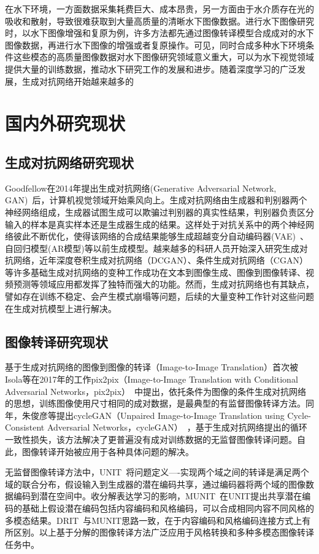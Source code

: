在水下环境，一方面数据采集耗费巨大、成本昂贵，另一方面由于水介质存在光的吸收和散射，导致很难获取到大量高质量的清晰水下图像数据。进行水下图像研究时，以水下图像增强和复原为例，许多方法都先通过图像转译模型合成成对的水下图像数据，再进行水下图像的增强或者复原操作。可见，同时合成多种水下环境条件这些模态的高质量图像数据对水下图像研究领域意义重大，可以为水下视觉领域提供大量的训练数据，推动水下研究工作的发展和进步。随着深度学习的广泛发展，生成对抗网络开始越来越多的


\section{国内外研究现状}
\subsection{生成对抗网络研究现状}
Goodfellow在2014年提出生成对抗网络(Generative Adversarial Network, GAN)~\cite{goodfellow2014generative}后，计算机视觉领域开始乘风向上。生成对抗网络由生成器和判别器两个神经网络组成，生成器试图生成可以欺骗过判别器的真实性结果，判别器负责区分输入的样本是真实样本还是生成器生成的结果。这样处于对抗关系中的两个神经网络彼此不断优化，使得该网络的合成结果能够生成超越变分自动编码器(VAE)~\cite{kingma2013auto}、自回归模型(AR模型)等以前生成模型。越来越多的科研人员开始深入研究生成对抗网络，近年深度卷积生成对抗网络（DCGAN）、条件生成对抗网络（CGAN）等许多基础生成对抗网络的变种工作成功在文本到图像生成、图像到图像转译、视频预测等领域应用都发挥了独特而强大的功能。然而，生成对抗网络也有其缺点，譬如存在训练不稳定、会产生模式崩塌等问题，后续的大量变种工作针对这些问题在生成对抗模型上进行解决。


\subsection{图像转译研究现状}
基于生成对抗网络的图像到图像的转译（Image-to-Image Translation）首次被Isola等在2017年的工作pix2pix（Image-to-Image Translation with Conditional Adversarial Networks，pix2pix）~\cite{isola2017image}中提出，依托条件为图像的条件生成对抗网络的思想，训练图像使用尺寸相同的成对数据，是最典型的有监督图像转译方法。同年，朱俊彦等提出cycleGAN（Unpaired Image-to-Image Translation using Cycle-Consistent Adversarial Networks，cycleGAN）~\cite{zhu2017unpaired}，基于生成对抗网络提出的循环一致性损失，该方法解决了更普遍没有成对训练数据的无监督图像转译问题。自此，图像转译开始被应用于各种具体问题的解决。

无监督图像转译方法中，UNIT~\cite{liu2017unsupervised}将问题定义----实现两个域之间的转译是满足两个域的联合分布，假设输入到生成器的潜在编码共享，通过编码器将两个域的图像数据编码到潜在空间中。收分解表达学习的影响，MUNIT~\cite{huang2018multimodal}在UNIT提出共享潜在编码的基础上假设潜在编码包括内容编码和风格编码，可以合成相同内容不同风格的多模态结果。DRIT~\cite{lee2018diverse}与MUNIT思路一致，在于内容编码和风格编码连接方式上有所区别。以上基于分解的图像转译方法广泛应用于风格转换和多种多模态图像转译任务中。

